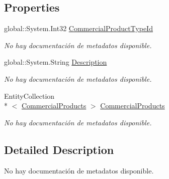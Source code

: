 \subsection*{Properties}
\begin{DoxyCompactItemize}
\item 
global\-::\-System.\-Int32 \hyperlink{class_microsoft_1_1_samples_1_1_kinect_1_1_basic_interactions_1_1_commercial_product_types_a4949a9c4b173afa88930185e0b89edc7}{Commercial\-Product\-Type\-Id}
\begin{DoxyCompactList}\small\item\em No hay documentación de metadatos disponible. \end{DoxyCompactList}\item 
global\-::\-System.\-String \hyperlink{class_microsoft_1_1_samples_1_1_kinect_1_1_basic_interactions_1_1_commercial_product_types_ada7f0864f2e53e48354d6463fd7ab72b}{Description}
\begin{DoxyCompactList}\small\item\em No hay documentación de metadatos disponible. \end{DoxyCompactList}\item 
Entity\-Collection\\*
$<$ \hyperlink{class_microsoft_1_1_samples_1_1_kinect_1_1_basic_interactions_1_1_commercial_products}{Commercial\-Products} $>$ \hyperlink{class_microsoft_1_1_samples_1_1_kinect_1_1_basic_interactions_1_1_commercial_product_types_aa1eb6500775213b15bc73baa5fe019f6}{Commercial\-Products}
\begin{DoxyCompactList}\small\item\em No hay documentación de metadatos disponible. \end{DoxyCompactList}\end{DoxyCompactItemize}


\subsection{Detailed Description}
No hay documentación de metadatos disponible. 



